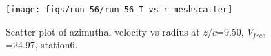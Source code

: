\begin{figure}[H]
\centering
\texttt{[image: figs/run\_56/run\_56\_T\_vs\_r\_meshscatter]}
\caption{Scatter plot of azimuthal velocity vs radius at $z/c$=9.50, $V_{free}$=24.97, station6.}
\label{fig:run_56_T_vs_r_meshscatter}
\end{figure}


